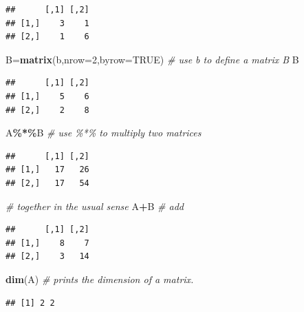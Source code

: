 \documentclass[
]{book}
\newenvironment{Shaded}{\begin{snugshade}}{\end{snugshade}}
\newcommand{\AttributeTok}[1]{\textcolor[rgb]{0.13,0.29,0.53}{#1}}
\newcommand{\CommentTok}[1]{\textcolor[rgb]{0.56,0.35,0.01}{\textit{#1}}}
\newcommand{\ConstantTok}[1]{\textcolor[rgb]{0.56,0.35,0.01}{#1}}
\newcommand{\DecValTok}[1]{\textcolor[rgb]{0.00,0.00,0.81}{#1}}
\newcommand{\FunctionTok}[1]{\textcolor[rgb]{0.13,0.29,0.53}{\textbf{#1}}}
\newcommand{\NormalTok}[1]{#1}
\newcommand{\OtherTok}[1]{\textcolor[rgb]{0.56,0.35,0.01}{#1}}
\newcommand{\SpecialCharTok}[1]{\textcolor[rgb]{0.81,0.36,0.00}{\textbf{#1}}}
\theoremstyle{definition}
\theoremstyle{definition}
\theoremstyle{definition}
\theoremstyle{definition}
\theoremstyle{remark}
\begin{document}
\begin{verbatim}
##      [,1] [,2]
## [1,]    3    1
## [2,]    1    6
\end{verbatim}

\begin{Shaded}
\begin{Highlighting}[]
\NormalTok{B}\OtherTok{=}\FunctionTok{matrix}\NormalTok{(b,}\AttributeTok{nrow=}\DecValTok{2}\NormalTok{,}\AttributeTok{byrow=}\ConstantTok{TRUE}\NormalTok{)    }\CommentTok{\# use b to define a matrix B}
\NormalTok{B}
\end{Highlighting}
\end{Shaded}

\begin{verbatim}
##      [,1] [,2]
## [1,]    5    6
## [2,]    2    8
\end{verbatim}

\begin{Shaded}
\begin{Highlighting}[]
\NormalTok{A}\SpecialCharTok{\%*\%}\NormalTok{B                            }\CommentTok{\# use \%*\% to multiply two matrices}
\end{Highlighting}
\end{Shaded}

\begin{verbatim}
##      [,1] [,2]
## [1,]   17   26
## [2,]   17   54
\end{verbatim}

\begin{Shaded}
\begin{Highlighting}[]
                                 \CommentTok{\# together in the usual sense}
\NormalTok{A}\SpecialCharTok{+}\NormalTok{B                              }\CommentTok{\# add}
\end{Highlighting}
\end{Shaded}

\begin{verbatim}
##      [,1] [,2]
## [1,]    8    7
## [2,]    3   14
\end{verbatim}

\begin{Shaded}
\begin{Highlighting}[]
\FunctionTok{dim}\NormalTok{(A)                           }\CommentTok{\# prints the dimension of a matrix.}
\end{Highlighting}
\end{Shaded}

\begin{verbatim}
## [1] 2 2
\end{verbatim}
\end{document}
